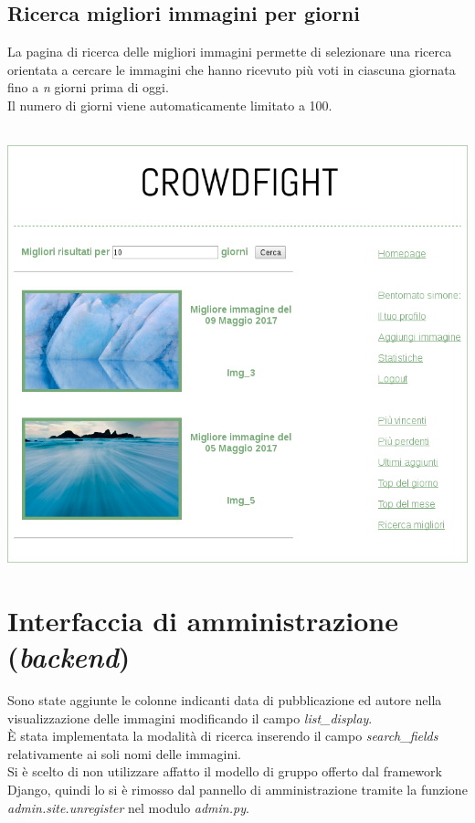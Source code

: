 \documentclass{scrreprt}
\begin{document}
\subsection{Ricerca migliori immagini per giorni}
La pagina di ricerca delle migliori immagini permette di selezionare una ricerca orientata a cercare le immagini che hanno ricevuto più voti in ciascuna giornata fino a \textit{n} giorni prima di oggi.\\
Il numero di giorni viene automaticamente limitato a 100.
\\\\
\centerline{\includegraphics[scale=0.43]{topdays}}
\pagebreak


\section{Interfaccia di amministrazione (\textit{backend})}

Sono state aggiunte le colonne indicanti data di pubblicazione ed autore nella visualizzazione delle immagini modificando il campo \textit{list_display}.\\
È stata implementata la modalità di ricerca inserendo il campo \textit{search_fields} relativamente ai soli nomi delle immagini.\\
Si è scelto di non utilizzare affatto il modello di gruppo offerto dal framework Django, quindi lo si è rimosso dal pannello di amministrazione tramite la funzione \textit{admin.site.unregister} nel modulo \textit{admin.py}.
\end{document}
